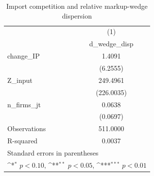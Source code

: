 \begin{table}[htbp]\centering
\def\sym#1{\ifmmode^{#1}\else\(^{#1}\)\fi}
\caption{Import competition and relative markup-wedge dispersion}
\begin{tabular}{l*{1}{c}}
\hline\hline
            &\multicolumn{1}{c}{(1)}\\
            &\multicolumn{1}{c}{d\_wedge\_disp}\\
\hline
change\_IP   &      1.4091         \\
            &    (6.2555)         \\
[1em]
Z\_input     &    249.4961         \\
            &  (226.0035)         \\
[1em]
n\_firms\_jt  &      0.0638         \\
            &    (0.0697)         \\
\hline
Observations&    511.0000         \\
R-squared   &      0.0037         \\
\hline\hline
\multicolumn{2}{l}{\footnotesize Standard errors in parentheses}\\
\multicolumn{2}{l}{\footnotesize \sym{*} \(p<0.10\), \sym{**} \(p<0.05\), \sym{***} \(p<0.01\)}\\
\end{tabular}
\end{table}
